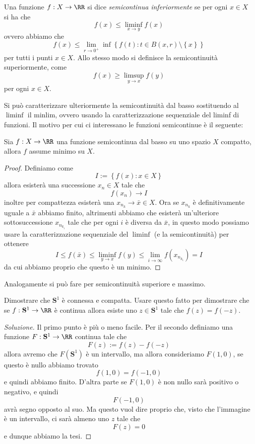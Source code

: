 \documentclass[11pt]{scrartcl}
\begin{document}
	\begin{definition}[Semicontinuità]
		Una funzione $f:X\to\RR$ si dice \textit{semicontinua inferiormente} se per ogni $x\in X$ si ha che
		$$f(x)\le \liminf_{x\to y}f(x)$$
		ovvero abbiamo che 
		$$f(x)\le \lim_{r\to 0^+}\inf\left\{f(t):t\in B(x,r)\setminus \left\{x\right\}\right\}$$
		per tutti i punti $x\in X$. Allo stesso modo si definisce la semicontinuità superiormente, come
		$$f(x)\ge \limsup_{y\to x}f(y)$$
		per ogni $x\in X$.
	\end{definition}
	Si può caratterizzare ulteriormente la semicontinuità dal basso sostituendo al $\liminf$ il minlim, ovvero usando la caratterizzazione sequenziale del liminf di funzioni. Il motivo per cui ci interessano le funzioni semicontinue è il seguente:
	\begin{theorem}
		Sia $f:X\to \RR$ una funzione semicontinua dal basso su uno spazio $X$ compatto, allora $f$ assume minimo su $X$. 
	\end{theorem}
	\begin{proof}
		Definiamo come
		$$I:=\left\{f(x):x\in X\right\}$$
		allora esisterà una successione $x_n\in X$ tale che 
		$$f(x_n)\to I$$
		inoltre per compattezza esisterà una $x_{n_k}\to \bar{x}\in X$. Ora se $x_{n_k}$ è definitivamente uguale a $\bar{x}$ abbiamo finito, altrimenti abbiamo che esisterà un'ulteriore sottosuccessione $x_{n_{k_i}}$ tale che per ogni $i$ è diversa da $\bar{x}$, in questo modo possiamo usare la caratterizzazione sequenziale del $\liminf$ (e la semicontinuità) per ottenere 
		$$I\le f(\bar{x})\le \liminf_{y\to x}f(y)\le \lim_{i\to\infty}f\left(x_{n_{k_i}}\right)=I$$
		da cui abbiamo proprio che questo è un minimo.
	\end{proof}
	Analogamente si può fare per semicontinuità superiore e massimo.
	\begin{exercise}
		Dimostrare che $\mathbf{S}^1$ è connessa e compatta. Usare questo fatto per dimostrare che se $f:\mathbf{S}^1\to \RR$ è continua allora esiste uno $z\in \mathbf{S}^1$ tale che $f(z)=f(-z)$.
	\end{exercise}
	\begin{proof}[Soluzione]
		Il primo punto è più o meno facile. Per il secondo 
		definiamo una funzione $F:\mathbf{S}^1\to\RR$ continua tale che
		$$F(z):=f(z)-f(-z)$$
		allora avremo che $F(\mathbf{S}^1)$ è un intervallo, ma allora consideriamo $F(1,0)$, se questo è nullo abbiamo trovato 
		$$f(1,0)=f(-1,0)$$
		e quindi abbiamo finito. D'altra parte se $F(1,0)$ è non nullo sarà positivo o negativo, e quindi 
		$$F(-1,0)$$
		avrà segno opposto al suo. Ma questo vuol dire proprio che, visto che l'immagine è un intervallo, ci sarà almeno uno $z$ tale che 
		$$F(z)=0$$
		e dunque abbiamo la tesi.
	\end{proof}
\end{document}
